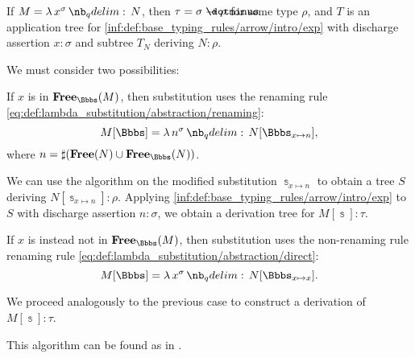 \begin{algorithm}
\begin{thmenum}
     If \( M = \qabs {x^\sigma} N \), then \( \tau = \sigma \synimplies \rho \) for some type \( \rho \), and \( T \) is an application tree for \ref{inf:def:base_typing_rules/arrow/intro/exp} with discharge assertion \( x: \sigma \) and subtree \( T_N \) deriving \( N: \rho \).

    We must consider two possibilities:
    \begin{thmenum}
       If \( x \) is in \( \op*{Free}_\Bbbs(M) \), then substitution uses the renaming rule \eqref{eq:def:lambda_substitution/abstraction/renaming}:
      \begin{equation*}
        M[\Bbbs] = \qabs {n^\sigma} N[\Bbbs_{x \mapsto n}],
      \end{equation*}
      where \( n = \sharp(\op*{Free}(N) \cup \op*{Free}_\Bbbs(N)) \).

      We can use the algorithm on the modified substitution \( \Bbbs_{x \mapsto n} \) to obtain a tree \( S \) deriving \( N[\Bbbs_{x \mapsto n}]: \rho \). Applying \ref{inf:def:base_typing_rules/arrow/intro/exp} to \( S \) with discharge assertion \( n: \sigma \), we obtain a derivation tree for \( M[\Bbbs]: \tau \).

       If \( x \) is instead not in \( \op*{Free}_\Bbbs(M) \), then substitution uses the non-renaming rule renaming rule \eqref{eq:def:lambda_substitution/abstraction/direct}:
      \begin{equation*}
        M[\Bbbs] = \qabs {x^\sigma} N[\Bbbs_{x \mapsto x}].
      \end{equation*}

      We proceed analogously to the previous case to construct a derivation of \( M[\Bbbs]: \tau \).
    \end{thmenum}
  \end{thmenum}
\end{algorithm}
\begin{comments}
  \item This algorithm can be found as  in \cite{notebook:code}.
\end{comments}

